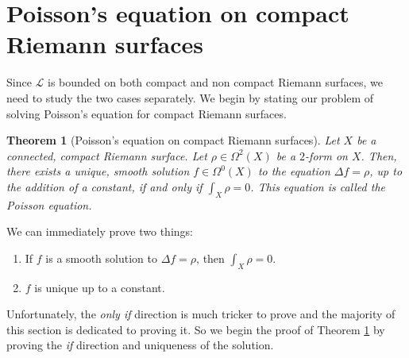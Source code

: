 \documentclass[11pt]{report}
\newtheorem{thm}{Theorem}[section]
\theoremstyle{definition}
\begin{document}
\section{Poisson's equation on compact Riemann surfaces}
Since $\mathcal{L}$ is bounded on both compact and non compact Riemann surfaces, we need to study the two cases separately. We begin by stating our problem of solving Poisson's equation for compact Riemann surfaces.
\begin{thm}[Poisson's equation on compact Riemann surfaces]\label{compactPoisson}
  Let $X$ be a connected, compact Riemann surface. Let $\rho \in \Omega^2(X)$ be a $2$-form on $X$. Then, there exists a unique, smooth solution $f \in \Omega^0(X)$ to the equation $\Delta f = \rho$, up to the addition of a constant, if and only if $\int_X \rho = 0$. This equation is called the Poisson equation.
\end{thm}
We can immediately prove two things:
\begin{enumerate}
  \item If $f$ is a smooth solution to $\Delta f = \rho$, then $\int_X \rho= 0$.
  \item $f$ is unique up to a constant.
\end{enumerate}
Unfortunately, the \emph{only if} direction is much tricker to prove and the majority of this section is dedicated to proving it. So we begin the proof of Theorem \ref{compactPoisson} by proving the \emph{if} direction and uniqueness of the solution.
\end{document}
